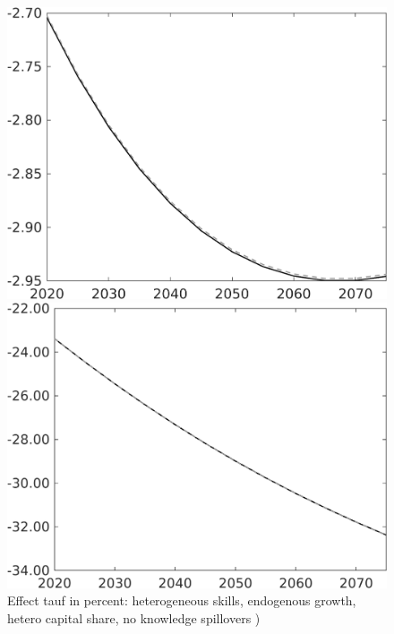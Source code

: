 \documentclass[12pt]{article}
\begin{document}
\begin{figure}[h!!]
	\centering
	\caption{Effect tauf in percent: heterogeneous skills, endogenous growth, hetero capital share, no knowledge spillovers )}\label{fig:Leveltauf_nsk0_xgr0_noknow_notaul3}
	\begin{minipage}[]{0.32\textwidth}
		\includegraphics[width=1\textwidth]{../../codding_model/own_basedOnFried/optimalPol_010922_revision/figures/all_13Sept22/PerdifNoTauf_regime0_CompTaul_sn_spillover0_nsk0_xgr0_knspil1_sep1_LFlimit0_emsbase0_countec0_GovRev0_etaa0.79_lgd0.png}
	\end{minipage}	
	\begin{minipage}[]{0.32\textwidth}
		\includegraphics[width=1\textwidth]{../../codding_model/own_basedOnFried/optimalPol_010922_revision/figures/all_13Sept22/PerdifNoTauf_regime0_CompTaul_sff_spillover0_nsk0_xgr0_knspil1_sep1_LFlimit0_emsbase0_countec0_GovRev0_etaa0.79_lgd0.png}

\end{minipage}
\end{figure}
\end{document}
